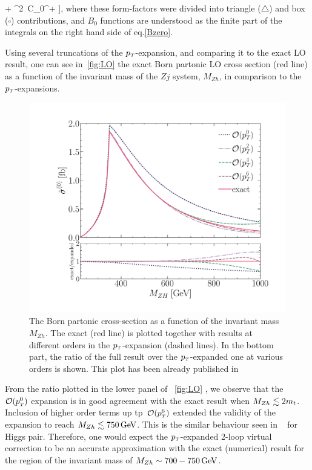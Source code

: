+ \mt^2 \,C_0^+  \Biggr],
\label{Asb}
\eea
where these form-factors were divided into triangle ($\triangle$) and
box ($\square$) contributions, and $B_0$ functions are understood as the
finite part of the integrals on the right hand side of eq.\eqref{Bzero}.
\par Using several truncations of the $p_{\scriptscriptstyle T}$-expansion, and comparing it to the exact LO result, one can see in~\autoref{fig:LO} the exact Born partonic LO cross section (red line) as a function of the invariant mass of the $Zj$ system, $M_{Zh}$, in comparison to the $p_{\scriptscriptstyle T}$-expansions. 
\begin{figure}[t]
	\centering
	\includegraphics[width=0.8\linewidth]{./figures/LO_ptexp_ratio_1000.pdf}
	\caption{The Born partonic cross-section
		as a function of the invariant mass $M_{Zh}$.
		The exact (red line) is plotted together with results at
		different orders in the $p_{\scriptscriptstyle T}$-expansion (dashed lines). In the bottom part,
		the ratio of the full result over the $p_{\scriptscriptstyle T}$-expanded one at
		various orders is shown. This plot has been already published in~\cite{Alasfar:2021ppe}}
	\label{fig:LO}
\end{figure}
From the ratio plotted in the lower panel of ~\autoref{fig:LO} , we observe that the~$\mathcal{O}(p_{\scriptscriptstyle T}^0)$ expansion is in good agreement with the exact result  when $M_{Zh}\lesssim 2m_t$. Inclusion of higher order terms up tp~$\mathcal{O}(p_{\scriptscriptstyle T}^6)$ extended the validity of the expansion to reach  $M_{Zh}\lesssim 750\,\textrm{GeV}$. This is the similar behaviour seen in ~\cite{Bonciani:2018omm} for Higgs pair.  Therefore, one would expect the $p_{\scriptscriptstyle T}$-expanded 2-loop virtual correction to be an accurate approximation with the exact (numerical) result for the region of the invariant mass of  $M_{Zh}\sim 700-750\,\textrm{GeV}$. 
